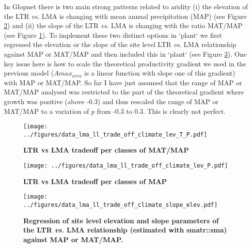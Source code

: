 \documentclass[a4paper,11pt]{article}
\begin{document}
In Glopnet there is two main strong patterns related to aridity (i) the elevation of the LTR \textit{vs.} LMA is changing with mean annual precipitation (MAP) (see Figure \ref{fig:MAP}) and (ii) the slope of the LTR \textit{vs.} LMA is changing with the ratio MAT/MAP (see Figure \ref{fig:MAT_MAP}). To implement these two distinct options in `plant` we first regressed the elevation or the slope of the site level LTR \textit{vs.} LMA relationship against MAP or MAT/MAP and then included this in `plant` (see Figure \ref{fig:elev_slope}). One key issue here is how to scale the theoretical productivity gradient we used in the previous model ($A{max}_{area}$ is a linear function with slope one of this gradient) with MAP or MAT/MAP. So far I have just assumed that the range of MAP or MAT/MAP analysed was restricted to the part of the theoretical gradient where growth was positive (above -0.3) and thus rescaled the range of MAP or MAT/MAP to a variation of $p$ from -0.3 to 0.3. This is clearly not perfect.

\begin{figure}[ht]
\centering
\texttt{[image: ../figures/data\_lma\_ll\_trade\_off\_climate\_lev\_T\_P.pdf]}
\caption{\textbf{LTR vs LMA tradeoff per classes of MAT/MAP}
\label{fig:MAT_MAP}}
\end{figure}


\begin{figure}[ht]
\centering
\texttt{[image: ../figures/data\_lma\_ll\_trade\_off\_climate\_lev\_P.pdf]}
\caption{\textbf{LTR vs LMA tradeoff per classes of MAP}
\label{fig:MAP}}
\end{figure}

\begin{figure}[ht]
\centering
\texttt{[image: ../figures/data\_lma\_ll\_trade\_off\_climate\_slope\_elev.pdf]}
\caption{\textbf{Regression of site level elevation and slope parameters of the LTR \textit{vs.} LMA relationship (estimated with smatr::sma) against MAP or MAT/MAP. }
\label{fig:elev_slope}}
\end{figure}


\end{document}
